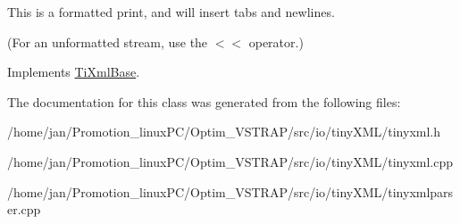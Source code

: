 This is a formatted print, and will insert tabs and newlines.

(For an unformatted stream, use the $<$$<$ operator.) 

Implements \hyperlink{classTiXmlBase_a0de56b3f2ef14c65091a3b916437b512}{Ti\+Xml\+Base}.



The documentation for this class was generated from the following files\+:\begin{DoxyCompactItemize}
\item 
/home/jan/\+Promotion\+\_\+linux\+P\+C/\+Optim\+\_\+\+V\+S\+T\+R\+A\+P/src/io/tiny\+X\+M\+L/tinyxml.\+h\item 
/home/jan/\+Promotion\+\_\+linux\+P\+C/\+Optim\+\_\+\+V\+S\+T\+R\+A\+P/src/io/tiny\+X\+M\+L/tinyxml.\+cpp\item 
/home/jan/\+Promotion\+\_\+linux\+P\+C/\+Optim\+\_\+\+V\+S\+T\+R\+A\+P/src/io/tiny\+X\+M\+L/tinyxmlparser.\+cpp\end{DoxyCompactItemize}
